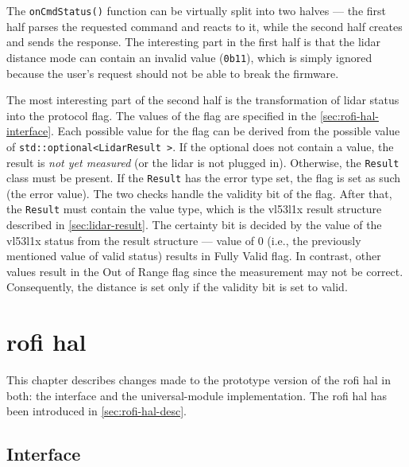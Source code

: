 \documentclass[
  digital,     %
  oneside,     %
  nosansbold,  %
  nocolorbold, %
  nolof,         %
  nolot,         %
]{fithesis4}
\newcommand{\TODO}[1]{#1} %
\newcommand{\TODOLIST}[1]{}
\begin{document}
The \lstinline|onCmdStatus()| function can be virtually split into two halves --- the first half
parses the requested command and reacts to it, while the second half creates and sends the response.
The interesting part in the first half is that the \acrshort{lidar} distance mode can contain an
invalid value (\lstinline|0b11|), which is simply ignored because the user's request should not be
able to break the firmware.

The most interesting part of the second half is the transformation of \acrshort{lidar} status into
the protocol flag. The values of the flag are specified in the \autoref{sec:rofi-hal-interface}.
Each possible value for the flag can be derived from the possible value of
\lstinline|std::optional<LidarResult >|. 
If the optional does not contain a value,  the result is \emph{not yet measured} (or
the \acrshort{lidar} is not plugged in). Otherwise, the \lstinline|Result| class must be present. If
the \lstinline|Result| has the error type set, the flag is set as such (the error value). The two
checks handle the validity bit of the flag. After that, the \lstinline|Result| must contain the
value type, which is the \gls{vl53l1x} result structure described in \autoref{sec:lidar-result}. The
certainty bit is decided by the value of the \gls{vl53l1x} status from the result structure ---
value of $0$ (i.e., the previously mentioned value of valid status) results in Fully Valid flag. In
contrast, other values result in the Out of Range flag since the measurement may not be correct.
Consequently, the distance is set only if the validity bit is set to valid.

\chapter[ RoFI Hardware Abstraction Layer ]{ \acrshort{rofi} \acrlong{hal} } \label{ch:rofi-hal}

This chapter describes changes made to the prototype version of the \acrshort{rofi} \acrshort{hal}
in both: the interface and the \gls{universal-module} implementation. The \acrshort{rofi}
\acrshort{hal} has been introduced in \autoref{sec:rofi-hal-desc}.

\section{Interface} \label{sec:rofi-hal-interface}

\TODOLIST{
\begin{itemize}
    \item Current interface components - RoFI, joint, connector
    \item \textbf{Proxy} 
    \item Changes done --- Added distance and status
\end{itemize}
}
\end{document}
